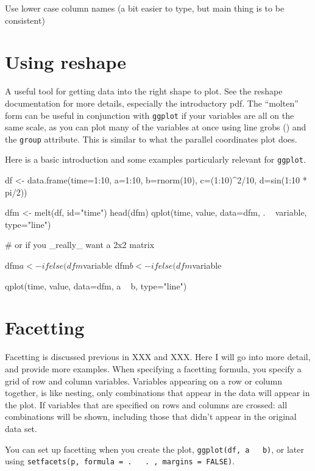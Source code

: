 Use lower case column names (a bit easier to type, but main thing is to be consistent)

\section{Using reshape}\label{sec:using_reshape}

A useful tool for getting data into the right shape to plot.  See the reshape documentation for more details, especially the introductory pdf.  The ``molten'' form can be useful in conjunction with {\tt ggplot} if your variables are all on the same scale, as you can plot many of the variables at once using line grobs () and the {\tt group} attribute.  This is similar to what the parallel coordinates plot does.

Here is a basic introduction and some examples particularly relevant for {\tt ggplot}.


df <- data.frame(time=1:10, a=1:10, b=rnorm(10), c=(1:10)^2/10, d=sin(1:10 * pi/2))

dfm <- melt(df, id="time")
head(dfm)
qplot(time, value, data=dfm, . ~ variable, type="line")

# or if you _really_ want a 2x2 matrix

dfm$a <- ifelse(dfm$variable %
dfm$b <- ifelse(dfm$variable %

qplot(time, value, data=dfm, a ~ b, type="line")


\section{Facetting}\label{sec:facetting}

Facetting is discussed previous in XXX and XXX.  Here I will go into more detail, and provide more examples.  When specifying a facetting formula, you specify a grid of row and column variables.  Variables appearing on a row or column together, is like nesting, only combinations that appear in the data will appear in the plot.  If variables that are specified on rows and columns are crossed: all combinations will be shown, including those that didn't appear in the original data set.  

You can set up facetting when you create the plot, {\tt ggplot(df, a ~ b)}, or later using \texttt{setfacets(p, formula = . ~ . , margins = FALSE)}.

